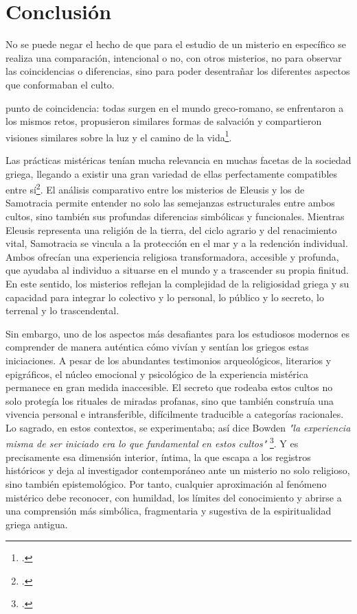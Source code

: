 \chapter{Conclusión}
No se puede negar el hecho de que para el estudio de un misterio en específico se realiza una comparación, intencional o no, con otros misterios, no para observar las coincidencias o diferencias, sino para poder desentrañar los diferentes aspectos que conformaban el culto. 

punto de coincidencia: todas surgen en el mundo greco-romano, se enfrentaron a los mismos retos, propusieron similares formas de salvación y compartieron visiones similares sobre la luz y el camino de la vida\footcite
{w.meyerAncientMysteriesSource1986}.  

Las prácticas mistéricas tenían mucha relevancia en muchas facetas de la sociedad griega, llegando a existir una gran variedad de ellas perfectamente compatibles entre sí\footcite[79-80]{moralgarciaInfluenciaMisteriosSamotracia2020}. El análisis comparativo entre los misterios de Eleusis y los de Samotracia permite entender no solo las semejanzas estructurales entre ambos cultos, sino también sus profundas diferencias simbólicas y funcionales. Mientras Eleusis representa una religión de la tierra, del ciclo agrario y del renacimiento vital, Samotracia se vincula a la protección en el mar y a la redención individual. Ambos ofrecían una experiencia religiosa transformadora, accesible y profunda, que ayudaba al individuo a situarse en el mundo y a trascender su propia finitud. En este sentido, los misterios reflejan la complejidad de la religiosidad griega y su capacidad para integrar lo colectivo y lo personal, lo público y lo secreto, lo terrenal y lo trascendental.

Sin embargo, uno de los aspectos más desafiantes para los estudiosos modernos es comprender de manera auténtica cómo vivían y sentían los griegos estas iniciaciones. A pesar de los abundantes testimonios arqueológicos, literarios y epigráficos, el núcleo emocional y psicológico de la experiencia mistérica permanece en gran medida inaccesible. El secreto que rodeaba estos cultos no solo protegía los rituales de miradas profanas, sino que también construía una vivencia personal e intransferible, difícilmente traducible a categorías racionales. Lo sagrado, en estos contextos, se experimentaba; así dice Bowden \textit{"la experiencia misma de ser iniciado era lo que fundamental en estos cultos"} \footcite[83]{bowdenMysteryCultsAncient2023}. Y es precisamente esa dimensión interior, íntima, la que escapa a los registros históricos y deja al investigador contemporáneo ante un misterio no solo religioso, sino también epistemológico. Por tanto, cualquier aproximación al fenómeno mistérico debe reconocer, con humildad, los límites del conocimiento y abrirse a una comprensión más simbólica, fragmentaria y sugestiva de la espiritualidad griega antigua. 

